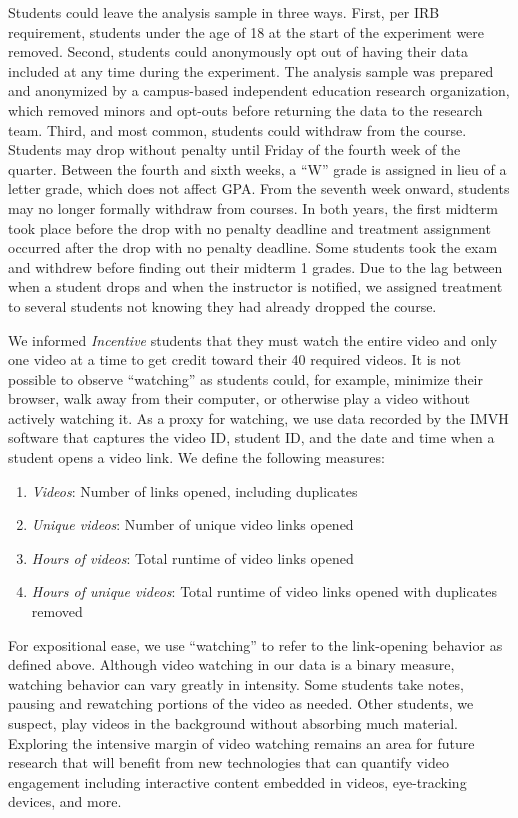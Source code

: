 Students could leave the analysis sample in three ways.
First, per IRB requirement, students under the age of 18 at the start of the experiment were removed.
Second, students could anonymously opt out of having their data included at any time during the experiment.
The analysis sample was prepared and anonymized by a campus-based independent education research organization, which removed minors and opt-outs before returning the data to the research team.
Third, and most common, students could withdraw from the course.
Students may drop without penalty until Friday of the fourth week of the quarter.
Between the fourth and sixth weeks, a ``W'' grade is assigned in lieu of a letter grade, which does not affect GPA.
From the seventh week onward, students may no longer formally withdraw from courses.
In both years, the first midterm took place before the drop with no penalty deadline and treatment assignment occurred after the drop with no penalty deadline.
Some students took the exam and withdrew before finding out their midterm 1 grades.
Due to the lag between when a student drops and when the instructor is notified, we assigned treatment to several students not knowing they had already dropped the course.

We informed \textit{Incentive} students that they must watch the entire video and only one video at a time to get credit toward their 40 required videos.
It is not possible to observe ``watching'' as students could, for example, minimize their browser, walk away from their computer, or otherwise play a video without actively watching it.
As a proxy for watching, we use data recorded by the IMVH software that captures the video ID, student ID, and the date and time when a student opens a video link.
We define the following measures:
\begin{enumerate}
	\item \textit{Videos}: Number of links opened, including duplicates
	\item \textit{Unique videos}: Number of unique video links opened
	\item \textit{Hours of videos}: Total runtime of video links opened
	\item \textit{Hours of unique videos}: Total runtime of video links opened with duplicates removed
\end{enumerate}

For expositional ease, we use ``watching'' to refer to the link-opening behavior as defined above.
Although video watching in our data is a binary measure, watching behavior can vary greatly in intensity.
Some students take notes, pausing and rewatching portions of the video as needed.
Other students, we suspect, play videos in the background without absorbing much material.
Exploring the intensive margin of video watching remains an area for future research that will benefit from new technologies that can quantify video engagement including interactive content embedded in videos, eye-tracking devices, and more.


